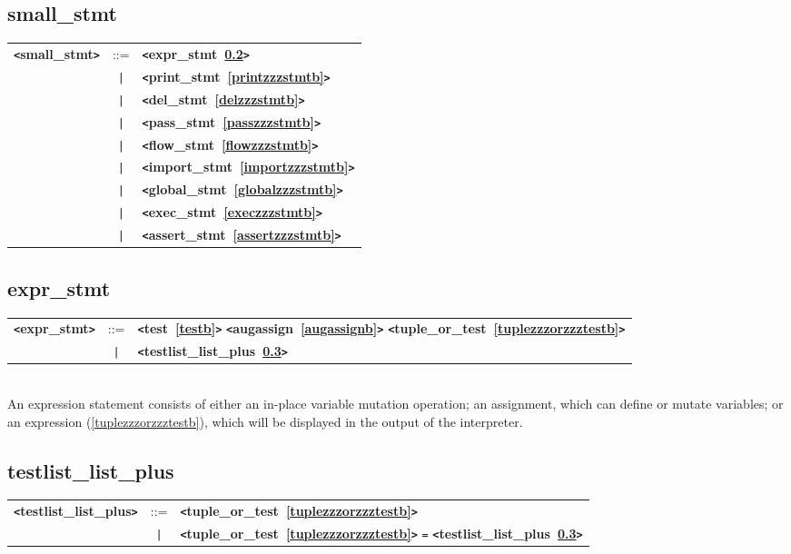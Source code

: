 \documentclass[12pt]{article}
\begin{document}
\subsection{small\_stmt}
\label{smallzzzstmtb}
\begin{tabular}{lcl}
{\bf \verb+<+small\_stmt\verb+>+} & ::=  & {\bf \verb+<+expr\_stmt~\ref{exprzzzstmtb}\verb+>+}  \\
 & \verb+|+  & {\bf \verb+<+print\_stmt~\ref{printzzzstmtb}\verb+>+}  \\
 & \verb+|+  & {\bf \verb+<+del\_stmt~\ref{delzzzstmtb}\verb+>+}  \\
 & \verb+|+  & {\bf \verb+<+pass\_stmt~\ref{passzzzstmtb}\verb+>+}  \\
 & \verb+|+  & {\bf \verb+<+flow\_stmt~\ref{flowzzzstmtb}\verb+>+}  \\
 & \verb+|+  & {\bf \verb+<+import\_stmt~\ref{importzzzstmtb}\verb+>+}  \\
 & \verb+|+  & {\bf \verb+<+global\_stmt~\ref{globalzzzstmtb}\verb+>+}  \\
 & \verb+|+  & {\bf \verb+<+exec\_stmt~\ref{execzzzstmtb}\verb+>+}  \\
 & \verb+|+  & {\bf \verb+<+assert\_stmt~\ref{assertzzzstmtb}\verb+>+}  \\
\end{tabular}

\subsection{expr\_stmt}
\label{exprzzzstmtb}
\begin{tabular}{lcl}
{\bf \verb+<+expr\_stmt\verb+>+} & ::=  & {\bf \verb+<+test~\ref{testb}\verb+>+}  {\bf \verb+<+augassign~\ref{augassignb}\verb+>+}  {\bf \verb+<+tuple\_or\_test~\ref{tuplezzzorzzztestb}\verb+>+}  \\
 & \verb+|+  & {\bf \verb+<+testlist\_list\_plus~\ref{testlistzzzlistzzzplusb}\verb+>+}  \\
\end{tabular} \\

An expression statement consists of either an in-place variable mutation operation; an assignment, which can define or mutate variables; or an expression (\ref{tuplezzzorzzztestb}), which will be displayed in the output of the interpreter.

\subsection{testlist\_list\_plus}
\label{testlistzzzlistzzzplusb}
\begin{tabular}{lcl}
{\bf \verb+<+testlist\_list\_plus\verb+>+} & ::=  & {\bf \verb+<+tuple\_or\_test~\ref{tuplezzzorzzztestb}\verb+>+}  \\
 & \verb+|+  & {\bf \verb+<+tuple\_or\_test~\ref{tuplezzzorzzztestb}\verb+>+}  \verb|=| {\bf \verb+<+testlist\_list\_plus~\ref{testlistzzzlistzzzplusb}\verb+>+}  \\
\end{tabular} \\
\end{document}
